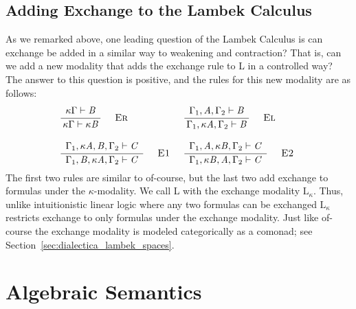 \documentclass{article}
\newcommand{\LE}{\text{L}_\kappa}
\begin{document}
\subsection{Adding Exchange to the Lambek Calculus}
\label{subsec:the_lambek_calculus_with_the_exchange_modality}
As we remarked above, one leading question of the Lambek Calculus is
can exchange be added in a similar way to weakening and contraction?
That is, can we add a new modality that adds the exchange rule to L in
a controlled way?  The answer to this question is positive, and the
rules for this new modality are as follows:
\[
\begin{array}{lll}
  \LdruleEr{} & \LdruleEl{}\\
  \\
  \LdruleEOne{} & \LdruleETwo{} 
\end{array}
\]
The first two rules are similar to of-course, but the last two add
exchange to formulas under the $\kappa$-modality.  We call L with the
exchange modality $\LE$.  Thus, unlike intuitionistic linear logic
where any two formulas can be exchanged $\LE$ restricts exchange to
only formulas under the exchange modality.  Just like of-course
the exchange modality is modeled categorically as a comonad; see
Section~\ref{sec:dialectica_lambek_spaces}.

\section{Algebraic Semantics}
\end{document}
